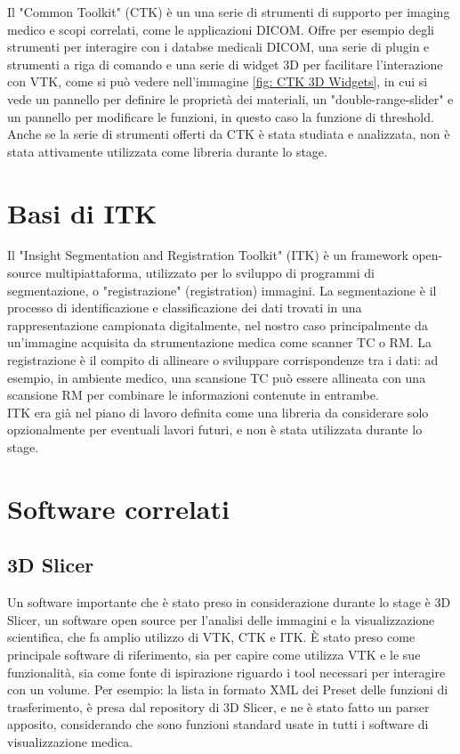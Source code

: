 Il "Common Toolkit" (CTK) è un una serie di strumenti di supporto per imaging medico e scopi correlati, come le applicazioni DICOM. Offre per esempio degli strumenti per interagire con i databse medicali DICOM, una serie di plugin e strumenti a riga di comando e una serie di widget 3D per facilitare l'interazione con VTK, come si può vedere nell'immagine \ref{fig: CTK 3D Widgets}, in cui si vede un pannello per definire le proprietà dei materiali, un "double-range-slider" e un pannello per modificare le funzioni, in questo caso la funzione di threshold.
\\
Anche se la serie di strumenti offerti da CTK è stata studiata e analizzata, non è stata attivamente utilizzata come libreria durante lo stage.

\section{Basi di ITK}

Il "Insight Segmentation and Registration Toolkit" (ITK) è un framework open-source multipiattaforma, utilizzato per lo sviluppo di programmi di segmentazione, o "registrazione" (registration) immagini. La segmentazione è il processo di identificazione e classificazione dei dati trovati in una rappresentazione campionata digitalmente, nel nostro caso principalmente da un'immagine acquisita da strumentazione medica come scanner TC o RM. La registrazione è il compito di allineare o sviluppare corrispondenze tra i dati: ad esempio, in ambiente medico, una scansione TC può essere allineata con una scansione RM per combinare le informazioni contenute in entrambe.
\\
ITK era già nel piano di lavoro definita come una libreria da considerare solo opzionalmente per eventuali lavori futuri, e non è stata utilizzata durante lo stage.

\section{Software correlati}
\subsection{3D Slicer}
Un software importante che è stato preso in considerazione durante lo stage è 3D Slicer, un software open source per l'analisi delle immagini e la visualizzazione scientifica, che fa amplio utilizzo di VTK, CTK e ITK. \`E stato preso come principale software di riferimento, sia per capire come utilizza VTK e le sue funzionalità, sia come fonte di ispirazione riguardo i tool necessari per interagire con un volume. Per esempio: la lista in formato XML dei Preset delle funzioni di trasferimento, è presa dal repository di 3D Slicer, e ne è stato fatto un parser apposito, considerando che sono funzioni standard usate in tutti i software di visualizzazione medica.

